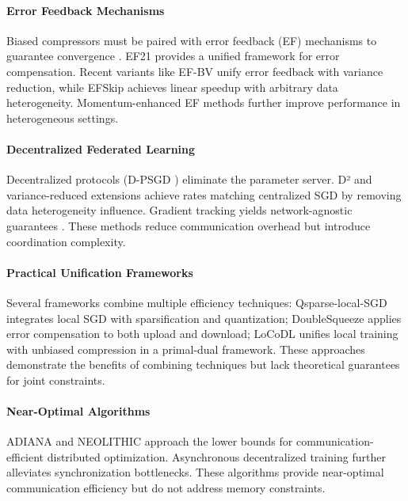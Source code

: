 \paragraph{Error Feedback Mechanisms}
Biased compressors must be paired with error feedback (EF) mechanisms to guarantee convergence \cite{karimireddy2019errorfeedback, stich2019errorfeedback}. EF21 \cite{richtarik2021ef21} provides a unified framework for error compensation. Recent variants like EF-BV \cite{condat2022efbv} unify error feedback with variance reduction, while EFSkip \cite{bao2025efskip} achieves linear speedup with arbitrary data heterogeneity. Momentum-enhanced EF methods \cite{cheng2023momentum} further improve performance in heterogeneous settings.

\paragraph{Decentralized Federated Learning}
Decentralized protocols (D-PSGD \cite{lian2017decentralized}) eliminate the parameter server. D² and variance-reduced extensions \cite{tang2018d2, yuan2021decentralized} achieve rates matching centralized SGD by removing data heterogeneity influence. Gradient tracking yields network-agnostic guarantees \cite{koloskova2020gradienttracking}. These methods reduce communication overhead but introduce coordination complexity.

\paragraph{Practical Unification Frameworks}
Several frameworks combine multiple efficiency techniques: Qsparse-local-SGD \cite{zhou2020qsparse} integrates local SGD with sparsification and quantization; DoubleSqueeze \cite{sun2020doublesqueeze} applies error compensation to both upload and download; LoCoDL \cite{zhang2022locodl} unifies local training with unbiased compression in a primal-dual framework. These approaches demonstrate the benefits of combining techniques but lack theoretical guarantees for joint constraints.

\paragraph{Near-Optimal Algorithms}
ADIANA \cite{li2021adiana} and NEOLITHIC \cite{huang2022neolithic} approach the lower bounds for communication-efficient distributed optimization. Asynchronous decentralized training \cite{lian2017async} further alleviates synchronization bottlenecks. These algorithms provide near-optimal communication efficiency but do not address memory constraints.

